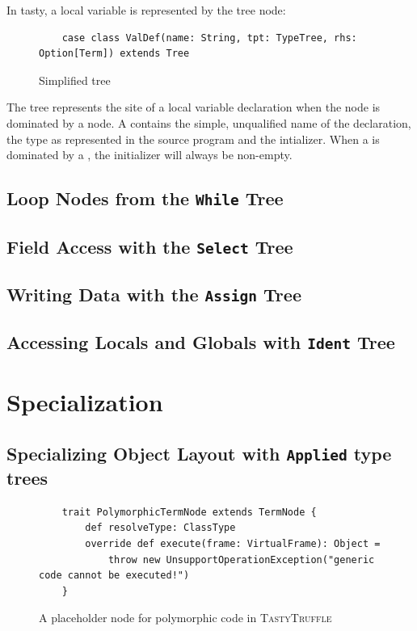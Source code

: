 In \acrshort{tasty}, a local variable is represented by the  tree node:

\begin{figure}[H]
	\begin{verbatim}
	case class ValDef(name: String, tpt: TypeTree, rhs: Option[Term]) extends Tree 
	\end{verbatim}
	\caption{Simplified  tree}
\end{figure}

The  tree represents the site of a local variable declaration when the node is dominated by a  node. 
A  contains the simple, unqualified name of the declaration, the type as represented in the source program and the intializer. 
When a  is dominated by a , the initializer will always be non-empty.

\subsection{Loop Nodes from the \texttt{While} Tree}

\subsection{Field Access with the \texttt{Select} Tree}

\subsection{Writing Data with the \texttt{Assign} Tree}

\subsection{Accessing Locals and Globals with \texttt{Ident} Tree}

\section{Specialization}
\label{implementation:specialization}

\subsection{Specializing Object Layout with \texttt{Applied} type trees}

\begin{figure}[!htb]
	\begin{verbatim}
	trait PolymorphicTermNode extends TermNode {
		def resolveType: ClassType 
		override def execute(frame: VirtualFrame): Object = 
			throw new UnsupportOperationException("generic code cannot be executed!")
	}
	\end{verbatim}
	\caption{A placeholder node for polymorphic code in \textsc{TastyTruffle}}
\end{figure}

